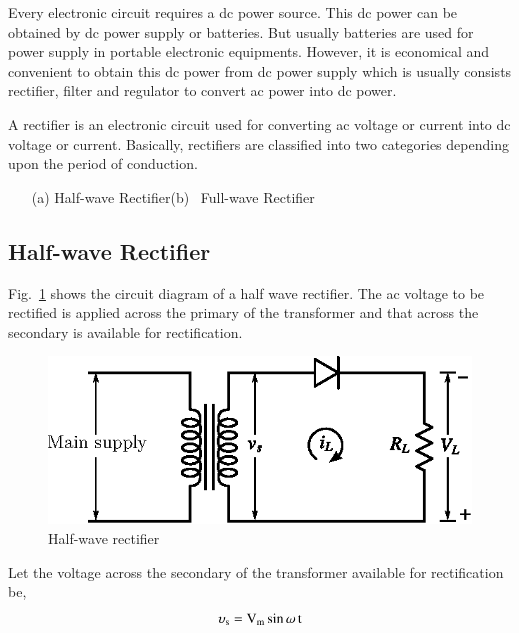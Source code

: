 Every electronic circuit requires a dc power source. This dc power can be obtained by dc power supply or batteries. But usually batteries are used for power supply in portable electronic equipments. However, it is economical and convenient to obtain this dc power from dc power supply which is usually consists rectifier, filter and regulator to convert ac power into dc power.

A rectifier is an electronic circuit used for converting ac voltage or current into dc voltage or current. Basically, rectifiers are classified into two categories depending upon the period of conduction.
\begin{itemize}
\item[(a)] Half-wave Rectifier\qquad (b)~ Full-wave Rectifier
\end{itemize}

\subsection{Half-wave Rectifier}\label{sec1.10.1}

Fig.~\ref{fig1.29} shows the circuit diagram of a half wave rectifier. The ac voltage to be rectified is applied across the primary of the transformer and that across the secondary is available for rectification.
\begin{figure}[H]
\centering
\includegraphics{chap1/fig1.29.eps}
\caption{Half-wave rectifier}\label{fig1.29}
\end{figure}

Let the voltage across the secondary of the transformer available for rectification be,
\begin{equation}
\upsilon_{\textrm{s}}=\textrm{V}_{\textrm{m}}\sin \omega\, \textrm{t} \label{eq1.8}
\end{equation}

